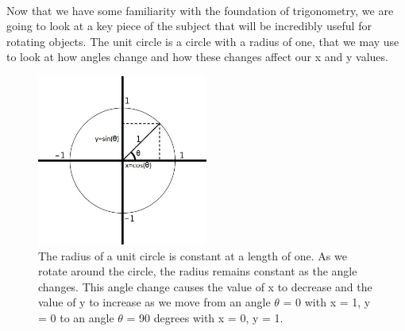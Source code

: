 \documentclass[12pt, letterpaper]{report}
\begin{document}
	\paragraph{} Now that we have some familiarity with the foundation of trigonometry, we are going to look at a key piece of the subject that will be incredibly useful for rotating objects. The unit circle is a circle with a radius of one, that we may use to look at how angles change and how these changes affect our x and y values.\\
	\begin{figure}[ht]
	\centering
	\includegraphics[width=0.5\textwidth]{Processing Images/UnitCircle/UnitCircle.jpg}
	\caption{The radius of a unit circle is constant at a length of one. As we rotate around the circle, the radius remains constant as the angle changes. This angle change causes the value of x to decrease and the value of y to increase as we move from an angle $\theta$ = 0 with x = 1, y = 0 to an angle $\theta$ = 90 degrees with x = 0, y = 1.}
	\end{figure}
\end{document}
